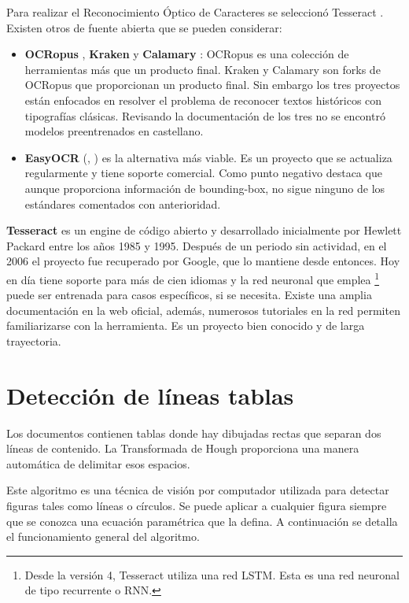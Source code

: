Para realizar el Reconocimiento Óptico de Caracteres se seleccionó Tesseract \cite{ocr_tesseract_raysmithetal.TesseractocrTesseract2021}. Existen otros de fuente abierta que se pueden considerar:

\begin{itemize}
    \item \textbf{OCRopus} \cite{ocr_ocropus_ocropy_project}, \textbf{Kraken}  y \textbf{Calamary} \cite{ocr_calamari_journal}: OCRopus es una colección de herramientas más que un producto final. Kraken y Calamary son forks de OCRopus que proporcionan un producto final. Sin embargo los tres proyectos están enfocados en resolver el problema de reconocer textos históricos con tipografías clásicas. Revisando la documentación de los tres no se encontró modelos preentrenados en castellano.
    \item \textbf{EasyOCR} (\cite{ocr_easyocr_official}, \cite{ocr_easyocr_project}) es la alternativa más viable. Es un proyecto que se actualiza regularmente y tiene soporte comercial. Como punto negativo destaca que aunque proporciona información de bounding-box, no sigue ninguno de los estándares comentados con anterioridad.
\end{itemize}

\textbf{Tesseract} \cite{ocr_tesseract_smith_paper} es un engine de código abierto y desarrollado inicialmente por Hewlett Packard \cite{ocr_tesseract_v4_release_notes} entre los años 1985 y 1995. Después de un periodo sin actividad, en el 2006 el proyecto fue recuperado por Google, que lo mantiene desde entonces. Hoy en día tiene soporte para más de cien idiomas y la red neuronal que emplea \footnote{Desde la versión 4, Tesseract utiliza una red LSTM. Esta es una red neuronal de tipo recurrente o RNN.} puede ser entrenada para casos específicos, si se necesita. Existe una amplia documentación en la web oficial, además, numerosos tutoriales en la red permiten familiarizarse con la herramienta. Es un proyecto bien conocido y de larga trayectoria.

\section{Detección de líneas tablas}

Los documentos contienen tablas donde hay dibujadas rectas que separan dos líneas de contenido. La Transformada de Hough proporciona una manera automática de delimitar esos espacios.

Este algoritmo es una técnica de visión por computador utilizada para detectar figuras tales como líneas o círculos. Se puede aplicar a cualquier figura siempre que se conozca una ecuación paramétrica que la defina. A continuación se detalla el funcionamiento general del algoritmo.

